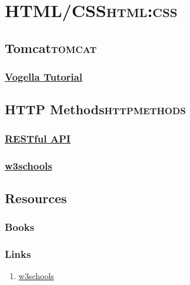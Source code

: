 \documentclass[11pt]{article}
\begin{document}
\section{HTML/CSS\hfill{}\textsc{html:css}}
\label{sec:org3f1bafe}
\subsection{Tomcat\hfill{}\textsc{tomcat}}
\label{sec:orgf7a304b}
\subsubsection{\href{http://www.vogella.com/tutorials/ApacheTomcat/article.html}{Vogella Tutorial}}
\label{sec:org03aa412}
\subsection{HTTP Methods\hfill{}\textsc{httpmethods}}
\label{sec:org54687cf}
\subsubsection{\href{https://restfulapi.net/http-methods/}{RESTful API}}
\label{sec:orga8c38c6}
\subsubsection{\href{https://www.w3schools.com/tags/ref\_httpmethods.asp}{w3schools}}
\label{sec:org6ccf5e1}
\subsection{Resources}
\label{sec:org316aea4}
\subsubsection{Books}
\label{sec:orgf9c0718}
\subsubsection{Links}
\label{sec:orgf52ea0c}
\begin{enumerate}
\item \href{https://www.w3schools.com/}{w3schools}
\label{sec:org9f35092}
\end{enumerate}
\end{document}
